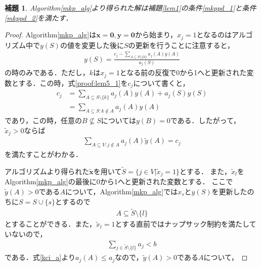 \documentclass[11pt,dvipdfmx]{jarticle}
\numberwithin{equation}{section}
\newtheorem{lem}{補題}[section]
\newtheorem{proof}{証明}
\begin{document}
            \begin{lem}
                \rm Algorithm\ref{mkp_alg}より得られた解は補題\ref{lem1}の条件\eqref{mkppd_1}と条件\eqref{mkppd_2}を満たす．
                \label{lem5}
            \end{lem}
            \begin{proof}
                \rm Algorithm\ref{mkp_alg}は$\bm{x}=\bm{0},\bm{y}=\bm{0}$から始まり，$x_j=1$となるのはアルゴリズム中で$y(S)$の値を変更した後に$S$の更新を行うことに注意すると，
                \begin{align}
                    y(S)=\frac{c_j-\sum_{A\subseteq S\setminus\{k\}}{a_j(A)y(A)}}{a_j(S)} \label{proof:lem5_1}
                \end{align}
                の時のみである．ただし，$k$は$x_j=1$となる前の反復で0から1へと更新された変数とする．この時，式\eqref{proof:lem5_1}を$c_j$について書くと，
                \begin{align}
                    c_j &=\sum_{A\subseteq S\setminus\{k\}}{a_j(A)y(A)}+a_j(S)y(S)\\
                        &=\sum_{A\subseteq S:k\notin A}{a_j(A)y(A)}
                \end{align}
                であり，この時，任意の$B\not\subseteq S$については$y(B)=0$である．したがって，$\tilde{x}_j>0$ならば
                \begin{align}
                    \sum_{A\subseteq V:j\notin A}{a_j(A)\tilde{y}(A)}=c_j
                \end{align}
                を満たすことがわかる．\par
                アルゴリズムより得られた$\tilde{\bm{x}}$を用いて$\tilde{S}=\{j\in V|\tilde{x}_j=1\}$とする．
                また，$\tilde{x}_l$をAlgorithm\ref{mkp_alg}の最後に0から1へと更新された変数とする．
                ここで$\tilde{y}(A)>0$である$A$について，Algorithm\ref{mkp_alg}では$x_s$と$y(S)$を更新したのちに$S=S\cup \{s\}$とするので
                \begin{align}
                    A\subseteq \tilde{S}\setminus\{l\}
                    \label{proof1}
                \end{align}
                とすることができる．また，$\tilde{x}_l=1$とする直前ではナップサック制約を満たしていないので，
                \begin{align}
                    \sum_{j\in\tilde{S}\setminus\{l\}}{a_j}<b
                    \label{proof2}
                \end{align}
                である．式\eqref{kci_a}より$a_j(A)\le a_j$なので，$\tilde{y}(A)>0$である$A$について，

\end{proof}
\end{document}
